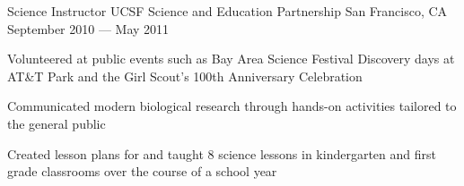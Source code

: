 \begin{cventries}

  \cventry
  {Science Instructor} %
  {UCSF Science and Education Partnership} %
  {San Francisco, CA} %
  {September 2010 --- May 2011} %
  {
    \begin{cvitems} %
    \item Volunteered at public events such as Bay Area Science Festival Discovery days at AT\&T Park and the Girl Scout's 100th Anniversary Celebration
    \item Communicated modern biological research through hands-on activities tailored to the general public
    \item Created lesson plans for and taught 8 science lessons in kindergarten and first grade classrooms over the course of a school year
    \end{cvitems}
  }

\end{cventries}
